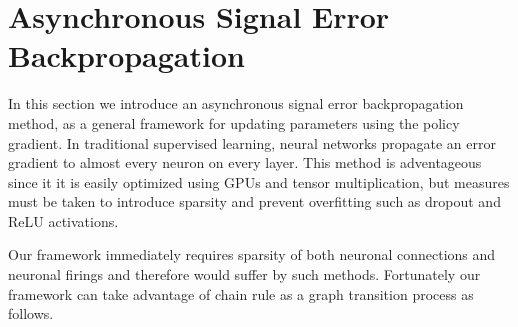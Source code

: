\section{Asynchronous Signal Error Backpropagation}

In this section we introduce an asynchronous signal error backpropagation method,
as a general framework for updating parameters using the policy gradient. In traditional
supervised learning, neural networks propagate an error gradient to almost every neuron on every layer.
This method is adventageous since it it is easily optimized using GPUs and tensor multiplication, but measures must be 
taken to introduce sparsity and prevent overfitting such as dropout and ReLU activations. 

Our framework immediately requires sparsity of both neuronal connections and neuronal firings and therefore would suffer 
by such methods. Fortunately our framework can take advantage of chain rule as a graph transition process as follows.